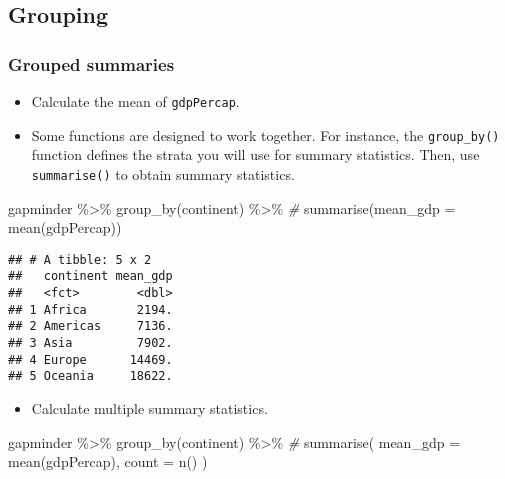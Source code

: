 \documentclass[
]{book}
\newenvironment{Shaded}{\begin{snugshade}}{\end{snugshade}}
\newcommand{\AttributeTok}[1]{\textcolor[rgb]{0.77,0.63,0.00}{#1}}
\newcommand{\CommentTok}[1]{\textcolor[rgb]{0.56,0.35,0.01}{\textit{#1}}}
\newcommand{\FunctionTok}[1]{\textcolor[rgb]{0.00,0.00,0.00}{#1}}
\newcommand{\NormalTok}[1]{#1}
\newcommand{\SpecialCharTok}[1]{\textcolor[rgb]{0.00,0.00,0.00}{#1}}
\providecommand{\tightlist}{%
  \setlength{\itemsep}{0pt}\setlength{\parskip}{0pt}}
\begin{document}
\hypertarget{grouping}{%
\subsection{Grouping}\label{grouping}}

\hypertarget{grouped-summaries}{%
\subsubsection{Grouped summaries}\label{grouped-summaries}}

\begin{itemize}
\item
  Calculate the mean of \texttt{gdpPercap}.
\item
  Some functions are designed to work together. For instance, the \texttt{group\_by()} function defines the strata you will use for summary statistics. Then, use \texttt{summarise()} to obtain summary statistics.
\end{itemize}

\begin{Shaded}
\begin{Highlighting}[]
\NormalTok{gapminder }\SpecialCharTok{\%\textgreater{}\%}
  \FunctionTok{group\_by}\NormalTok{(continent) }\SpecialCharTok{\%\textgreater{}\%} \CommentTok{\#}
  \FunctionTok{summarise}\NormalTok{(}\AttributeTok{mean\_gdp =} \FunctionTok{mean}\NormalTok{(gdpPercap))}
\end{Highlighting}
\end{Shaded}

\begin{verbatim}
## # A tibble: 5 x 2
##   continent mean_gdp
##   <fct>        <dbl>
## 1 Africa       2194.
## 2 Americas     7136.
## 3 Asia         7902.
## 4 Europe      14469.
## 5 Oceania     18622.
\end{verbatim}

\begin{itemize}
\tightlist
\item
  Calculate multiple summary statistics.
\end{itemize}

\begin{Shaded}
\begin{Highlighting}[]
\NormalTok{gapminder }\SpecialCharTok{\%\textgreater{}\%}
  \FunctionTok{group\_by}\NormalTok{(continent) }\SpecialCharTok{\%\textgreater{}\%} \CommentTok{\#}
  \FunctionTok{summarise}\NormalTok{(}
    \AttributeTok{mean\_gdp =} \FunctionTok{mean}\NormalTok{(gdpPercap),}
    \AttributeTok{count =} \FunctionTok{n}\NormalTok{()}
\NormalTok{  )}
\end{Highlighting}
\end{Shaded}
\end{document}
